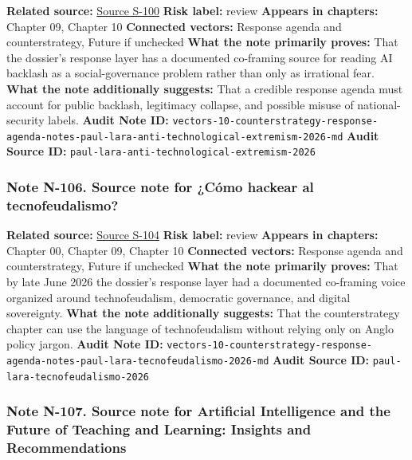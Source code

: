 \documentclass[
  american,
  11pt,
  letterpaper,
]{article}
\begin{document}
\textbf{Related source:}
\hyperref[source-s-100-extremismo-antitecnol-gico]{Source S-100}
\textbf{Risk label:} review \textbf{Appears in chapters:} Chapter 09,
Chapter 10 \textbf{Connected vectors:} Response agenda and
counterstrategy, Future if unchecked \textbf{What the note primarily
proves:} That the dossier's response layer has a documented co-framing
source for reading AI backlash as a social-governance problem rather
than only as irrational fear. \textbf{What the note additionally
suggests:} That a credible response agenda must account for public
backlash, legitimacy collapse, and possible misuse of national-security
labels. \textbf{Audit Note ID:}
\texttt{vectors-10-counterstrategy-response-agenda-notes-paul-lara-anti-technological-extremism-2026-md}
\textbf{Audit Source ID:}
\texttt{paul-lara-anti-technological-extremism-2026}

\subsubsection{Note N-106. Source note for ¿Cómo hackear al
tecnofeudalismo?}\label{note-n-106-vectors-10-counterstrategy-response-agenda-notes-paul-lara-tecnofeudalismo-2026-md}

\textbf{Related source:}
\hyperref[source-s-104-c-mo-hackear-al-tecnofeudalismo]{Source S-104}
\textbf{Risk label:} review \textbf{Appears in chapters:} Chapter 00,
Chapter 09, Chapter 10 \textbf{Connected vectors:} Response agenda and
counterstrategy, Future if unchecked \textbf{What the note primarily
proves:} That by late June 2026 the dossier's response layer had a
documented co-framing voice organized around technofeudalism, democratic
governance, and digital sovereignty. \textbf{What the note additionally
suggests:} That the counterstrategy chapter can use the language of
technofeudalism without relying only on Anglo policy jargon.
\textbf{Audit Note ID:}
\texttt{vectors-10-counterstrategy-response-agenda-notes-paul-lara-tecnofeudalismo-2026-md}
\textbf{Audit Source ID:} \texttt{paul-lara-tecnofeudalismo-2026}

\subsubsection{Note N-107. Source note for Artificial Intelligence and
the Future of Teaching and Learning: Insights and
Recommendations}\label{note-n-107-vectors-10-counterstrategy-response-agenda-notes-us-ed-ai-future-teaching-learning-2023-md}
\end{document}
